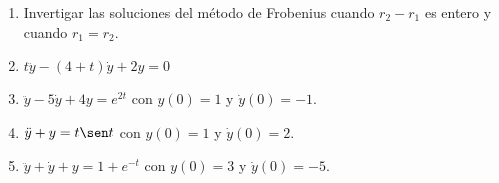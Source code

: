 \documentclass{article}
\begin{document}
\begin{enumerate}
        \item {
            Invertigar las soluciones del método de Frobenius cuando $r_2 - r_1$
            es entero y cuando $r_1 = r_2$.

            \color{azul}
        }

        \item {
            $t\ddot y - (4 + t)\dot y + 2y = 0$

            \color{azul}
        }

        \item {
            $\ddot y - 5 \dot y + 4y = e^{2t}$ con $y(0) = 1$ y $\dot y(0) = -1$.

            \color{azul}
        }

        \item {
            $\ddot y + y = t\sen t$ con $y(0) = 1$ y  $\dot y(0) = 2$.

            \color{azul}
        }

        \item {
            $\ddot y + \dot y + y = 1 + e^{-t}$ con $y(0) = 3$ y $\dot y(0) = -5$.

            \color{azul}
        }
    \end{enumerate}
\end{document}
